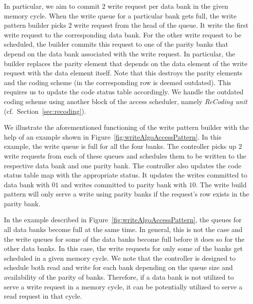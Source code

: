 In particular, we aim to commit $2$ write request per data bank in the given memory cycle. When the write queue for a particular bank gets full, the write pattern builder picks $2$ write request from the head of the queue. It write the first write request to the corresponding data bank. For the other write request to be scheduled, the builder commits this request to one of the parity banks that depend on the data bank associated with the write request. {\color{blue}In particular, the builder replaces the parity element that depends on the data element of the write request with the data element itself. Note that this destroys the parity elements and the coding scheme (in the corresponding row is deemed outdated).} This requires us to update the code status table accordingly. We handle the outdated coding scheme using another block of the access scheduler, namely {\em ReCoding unit} (cf.~Section~\ref{sec:recoding}).


We illustrate the aforementioned functioning of the write pattern builder with the help of an example shown in Figure~\ref{fig:writeAlgoAccessPattern}. In this example, the write queue is full for all the four banks. The controller picks up $2$ write requests from each of these queues and schedules them to be written to the respective data bank and one parity bank. The controller also updates the code status table map with the appropriate status. It updates the writes committed to data bank with $01$ and writes committed to parity bank with $10$. {\color{blue}The write build pattern will only serve a write using parity banks if the request's row exists in the parity bank.}


\begin{remark}
In the example described in Figure~\ref{fig:writeAlgoAccessPattern}, the queues for all data banks become full at the same time. In general, this is not the case and the write queues for some of the data banks become full before it does so for the other data banks. In this case, the write requests for only some of the banks get scheduled in a given memory cycle.{\color{blue} We note that the controller is designed to schedule both read and write for each bank depending on 
the queue size and availability of the parity of banks. Therefore, if a data bank is not utilized to serve a write request in a memory cycle, it can be potentially utilized to serve a read request in that cycle.}
\end{remark}

